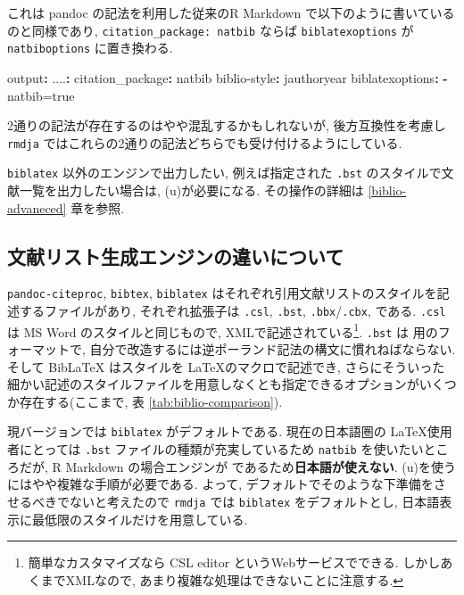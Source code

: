 \documentclass[
]{bxjsbook}
\newenvironment{Shaded}{\begin{snugshade}}{\end{snugshade}}
\newcommand{\AttributeTok}[1]{\textcolor[rgb]{0.77,0.63,0.00}{#1}}
\newcommand{\FunctionTok}[1]{\textcolor[rgb]{0.00,0.00,0.00}{#1}}
\newcommand{\KeywordTok}[1]{\textcolor[rgb]{0.13,0.29,0.53}{\textbf{#1}}}
\theoremstyle{definition}
\theoremstyle{definition}
\theoremstyle{definition}
\theoremstyle{remark}
\begin{document}
これは pandoc の記法を利用した従来のR Markdown
で以下のように書いているのと同様であり,
\texttt{citation\_package:\ natbib} ならば \texttt{biblatexoptions} が
\texttt{natbiboptions} に置き換わる.

\begin{Shaded}
\begin{Highlighting}[]
\FunctionTok{output}\KeywordTok{:}
\AttributeTok{  }\FunctionTok{....}\KeywordTok{:}
\AttributeTok{    }\FunctionTok{citation\_package}\KeywordTok{:}\AttributeTok{ natbib}
\FunctionTok{biblio{-}style}\KeywordTok{:}\AttributeTok{ jauthoryear}
\FunctionTok{biblatexoptions}\KeywordTok{:}
\AttributeTok{  }\KeywordTok{{-}}\AttributeTok{ natbib=true}
\end{Highlighting}
\end{Shaded}

2通りの記法が存在するのはやや混乱するかもしれないが, 後方互換性を考慮し
\texttt{rmdja}
ではこれらの2通りの記法どちらでも受け付けるようにしている.

\texttt{biblatex} 以外のエンジンで出力したい, 例えば指定された
\texttt{.bst} のスタイルで文献一覧を出力したい場合は,
(u)\pBibTeX が必要になる. その操作の詳細は \ref{biblio-advaneced}
章を参照.

\hypertarget{ux6587ux732eux30eaux30b9ux30c8ux751fux6210ux30a8ux30f3ux30b8ux30f3ux306eux9055ux3044ux306bux3064ux3044ux3066}{%
\subsection{文献リスト生成エンジンの違いについて}\label{ux6587ux732eux30eaux30b9ux30c8ux751fux6210ux30a8ux30f3ux30b8ux30f3ux306eux9055ux3044ux306bux3064ux3044ux3066}}

\texttt{pandoc-citeproc}, \texttt{bibtex}, \texttt{biblatex}
はそれぞれ引用文献リストのスタイルを記述するファイルがあり,
それぞれ拡張子は \texttt{.csl}, \texttt{.bst},
\texttt{.bbx}/\texttt{.cbx}, である. \texttt{.csl} は MS Word
のスタイルと同じもので, XMLで記述されている\footnote{簡単なカスタマイズなら
  CSL editor というWebサービスでできる. しかしあくまでXMLなので,
  あまり複雑な処理はできないことに注意する.}. \texttt{.bst} は
\BibTeX 用のフォーマットで,
自分で改造するには逆ポーランド記法の構文に慣れねばならない. そして
BibLaTeX はスタイルを \LaTeX のマクロで記述でき,
さらにそういった細かい記述のスタイルファイルを用意しなくとも指定できるオプションがいくつか存在する(ここまで,
表 \ref{tab:biblio-comparison}).

現バージョンでは \texttt{biblatex} がデフォルトである. 現在の日本語圏の
\LaTeX 使用者にとっては \texttt{.bst} ファイルの種類が充実しているため
\texttt{natbib} を使いたいところだが, R Markdown の場合エンジンが
\BibTeX であるため\textbf{日本語が使えない}.
(u)\pBibTeX を使うにはやや複雑な手順が必要である. よって,
デフォルトでそのような下準備をさせるべきでないと考えたので
\texttt{rmdja} では \texttt{biblatex} をデフォルトとし,
日本語表示に最低限のスタイルだけを用意している.
\end{document}
